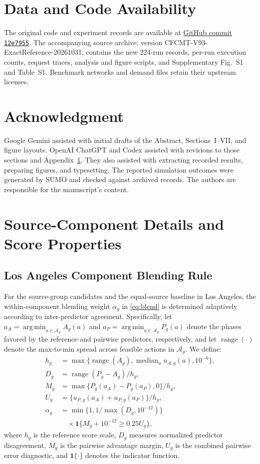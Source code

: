 \documentclass[letterpaper,journal]{IEEEtran}
\newcommand{\ind}{\mathbf{1}}
\DeclareMathOperator*{\argmin}{arg\,min}
\DeclareMathOperator{\range}{range}
\DeclareMathOperator{\median}{median}
\begin{document}
\section*{Data and Code Availability}
\begingroup\raggedright
The original code and experiment records are available at \href{https://github.com/erzhu419/CFCMT/tree/12e7955d0350e4cac2a344d04954cfb5efea70a2}{GitHub commit \texttt{12e7955}}. The accompanying source archive, version CFCMT-V93-ExactReference-20261031, contains the new 224-run records, per-run execution counts, request traces, analysis and figure scripts, and Supplementary Fig.~S1 and Table~S1. Benchmark networks and demand files retain their upstream licenses.
\par\endgroup

\section*{Acknowledgment}
Google Gemini assisted with initial drafts of the Abstract, Sections~I--VII, and figure layouts. OpenAI ChatGPT and Codex assisted with revisions to those sections and Appendix~\ref{app:score-proofs}. They also assisted with extracting recorded results, preparing figures, and typesetting. The reported simulation outcomes were generated by SUMO and checked against archived records. The authors are responsible for the manuscript's content.

\appendices
\section{Source-Component Details and Score Properties}
\label{app:score-proofs}

\subsection{Los Angeles Component Blending Rule}
For the source-group candidates and the equal-source baseline in Los Angeles, the within-component blending weight $\alpha_g$ in \eqref{eq:blend} is determined adaptively according to inter-predictor agreement. Specifically, let $a_A = \argmin_{a\in\mathcal A_g} A_g(a)$ and $a_P = \argmin_{a\in\mathcal A_g} P_g(a)$ denote the phases favored by the reference and pairwise predictors, respectively, and let $\range(\cdot)$ denote the max-to-min spread across feasible actions in $\mathcal A_g$. We define:
\begin{align}
 h_g&=\max\{\range(A_g),\median_a u_{A,g}(a),10^{-6}\},\nonumber\\
 D_g&=\range(P_g-A_g)/h_g,\nonumber\\
 M_g&=\max\{P_g(a_A)-P_g(a_P),0\}/h_g,\nonumber\\
 U_g&=\{u_{P,g}(a_A)+u_{P,g}(a_P)\}/h_g,\nonumber\\
 \alpha_g&=\min\{1,1/\max(D_g,10^{-12})\}\nonumber\\
 &\quad{}\times\ind\{M_g+10^{-12}\geq0.25U_g\},
 \label{eq:la-component-blend}
\end{align}
where $h_g$ is the reference score scale, $D_g$ measures normalized predictor disagreement, $M_g$ is the pairwise advantage margin, $U_g$ is the combined pairwise error diagnostic, and $\ind\{\cdot\}$ denotes the indicator function.
\end{document}
